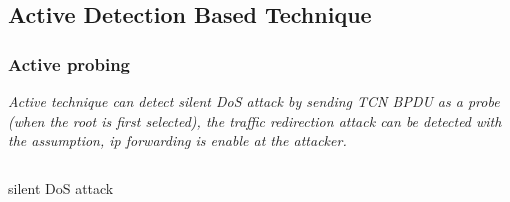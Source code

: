 \documentclass[10pt, blue,subsection=true, compress]{beamer}
\begin{document}
\subsection*{Active Detection Based Technique}
\begin{frame} \frametitle{Active probing}
\emph{Active technique can detect silent DoS attack by sending TCN BPDU as a probe (when the root is first selected), the traffic redirection attack can be detected with the assumption, \textit{ip forwarding} is enable at the attacker. } 

\begin{columns}[t]
   
   \begin{center}
   
   \begin{block}{silent DoS attack}


\end{block}
\end{center}
\end{columns}
\end{frame}
\end{document}
